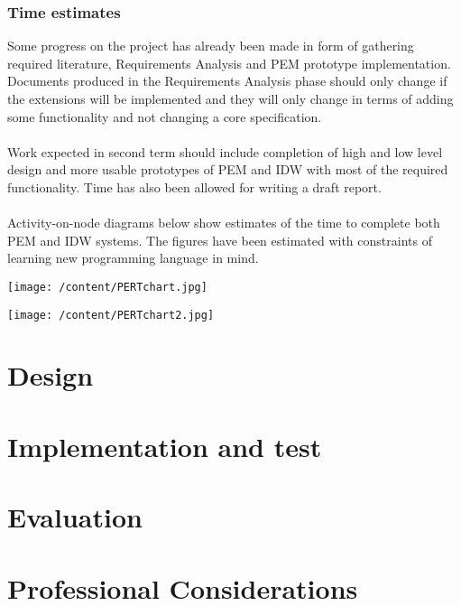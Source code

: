 \documentclass[12pt, a4paper]{report}   %
\begin{document}
\begin{enumerate}
\subsection{Time estimates}
Some progress on the project has already been made in form of gathering required literature, Requirements Analysis and PEM prototype implementation. Documents produced in the Requirements Analysis phase should only change if the extensions will be implemented and they will only change in terms of adding some functionality and not changing a core specification.\\ \\
Work expected in second term should include completion of high and low level design and more usable prototypes of PEM and IDW with most of the required functionality. Time has also been allowed for writing a draft report.\\ \\
Activity-on-node diagrams below show estimates of the time to complete both PEM and IDW systems. The figures have been estimated with constraints of learning new programming language in mind.

\texttt{[image: /content/PERTchart.jpg]}

\texttt{[image: /content/PERTchart2.jpg]}

\chapter{Design}

\chapter{Implementation and test}

\chapter{Evaluation}

\chapter{Professional Considerations}

\end{enumerate}
\end{document}
